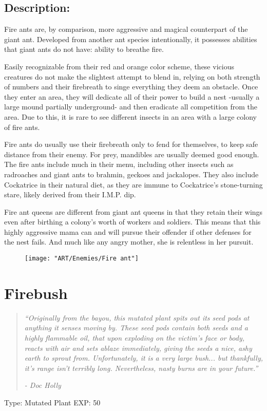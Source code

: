 \documentclass[11pt,a4paper,twocolumn]{book}
\begin{document}
	\vfill
	\subsection*{Description:}
	Fire ants are, by comparison, more aggressive and magical counterpart of the giant ant. Developed from another ant species intentionally, it possesses abilities that giant ants do not have: ability to breathe fire.
	
	Easily recognizable from their red and orange color scheme, these vicious creatures do not make the slightest attempt to blend in, relying on both strength of numbers and their firebreath to singe everything they deem an obstacle. Once they enter an area, they will dedicate all of their power to build a nest -usually a large mound partially underground- and then eradicate all competition from the area. Due to this, it is rare to see different insects in an area with a large colony of fire ants.
	
	\bigskip
	Fire ants do usually use their firebreath only to fend for themselves, to keep safe distance from their enemy. For prey, mandibles are usually deemed good enough. The fire ants include much in their menu, including other insects such as radroaches and giant ants to brahmin, geckoes and jackalopes. They also include Cockatrice in their natural diet, as they are immune to Cockatrice's stone-turning stare, likely derived from their I.M.P. dip.
	
	Fire ant queens are different from giant ant queens in that they retain their wings even after birthing a colony's worth of workers and soldiers. This means that this highly aggressive mama can and will pursue their offender if other defenses for the nest fails. And much like any angry mother, she is relentless in her pursuit.
	
	\begin{figure}
		\centering
		\texttt{[image: "ART/Enemies/Fire ant"]}
	\end{figure}
	
	
	\clearpage
	
	\section*{Firebush}
	\begin{quote}
		\emph{``Originally from the bayou, this mutated plant spits out its seed pods at anything it senses moving by. These seed pods contain both seeds and a highly flammable oil, that upon exploding on the victim's face or body, reacts with air and sets ablaze immediately, giving the seeds a nice, ashy earth to sprout from. Unfortunately, it is a very large bush... but thankfully, it's range isn't terribly long. Nevertheless, nasty burns are in your future.''}
		
		\emph{-	Doc Holly}
	\end{quote}
	Type: Mutated Plant
	EXP: 50
	
\end{document}
